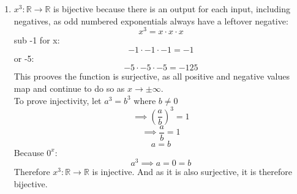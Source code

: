 \documentclass{article}
\begin{document}
\begin{enumerate}
  \setcounter{equation}{0}
  \newpage
  \item $x^{3} : \mathbb{R} \to \mathbb{R}$ is bijective because there is an output for each input, including negatives,
    as odd numbered exponentials always have a leftover negative:
    \begin{equation}
      x^{3} = x \cdot x \cdot x
    \end{equation}
    sub -1 for x:
    \begin{equation}
      -1 \cdot -1 \cdot -1 = -1
    \end{equation}
    or -5:
    \begin{equation}
      -5 \cdot -5 \cdot -5 = -125
    \end{equation}
    This prooves the function is surjective, as all positive and negative values map and continue to do so as $x \to \pm \infty$. \\
    To prove injectivity, let $a^{3} = b^{3}$ where $b \neq 0$
    \begin{equation}
      \implies \left(\frac{a}{b} \right)^{3} = 1
    \end{equation}
    \begin{equation}
      \implies \frac{a}{b} = 1
    \end{equation}
    \begin{equation}
      a = b
    \end{equation}
    Because $0^{x}$:
    \begin{equation}
    a^{3} \implies a = 0 = b  
    \end{equation}
    Therefore $x^{3} : \mathbb{R} \to \mathbb{R}$ is injective. And as it is also surjective, it is therefore bijective. 
      
\end{enumerate}
\end{document}
